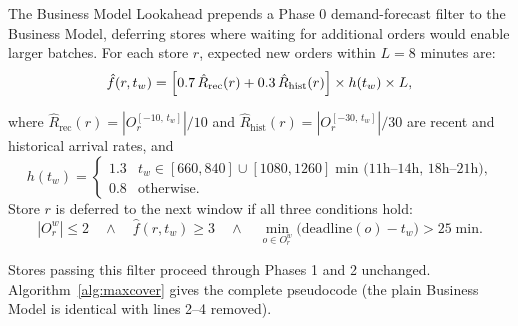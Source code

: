 \documentclass[runningheads]{llncs}
\begin{document}
The Business Model Lookahead prepends a Phase 0 demand-forecast filter to the Business Model, deferring stores where waiting for additional orders would enable larger batches.
For each store $r$, expected new orders within $L=8$ minutes are:
\vspace{-10pt}
\begin{equation}\label{eq:forecast}
    \hat{f}(r, t_w) =
    \Bigl[0.7\,\hat{R}_{\text{rec}}(r) + 0.3\,\hat{R}_{\text{hist}}(r)\Bigr]
    \times h(t_w) \times L,
\end{equation}

where $\hat{R}_{\text{rec}}(r) = |O_{r}^{[-10,\,t_w]}|/10$ and $\hat{R}_{\text{hist}}(r) = |O_{r}^{[-30,\,t_w]}|/30$ are recent and historical arrival rates, and
\vspace{-6pt}
{\small
\begin{equation}\label{eq:hour_mult}
    h(t_w) =
    \begin{cases}
        1.3 & t_w \in [660, 840] \cup [1080, 1260]\;\text{min (11h--14h, 18h--21h),} \\
        0.8 & \text{otherwise.}
    \end{cases}
\end{equation}
}
\vspace{-6pt}
Store $r$ is deferred to the next window if all three conditions hold:
\vspace{-5pt}
\begin{equation}\label{eq:wait_condition}
    |O^w_r| \leq 2
    \quad\wedge\quad
    \hat{f}(r, t_w) \geq 3
    \quad\wedge\quad
    \min_{o \in O^w_r}\!\bigl(\text{deadline}(o) - t_w\bigr) > 25\;\text{min.}
\end{equation}

Stores passing this filter proceed through Phases 1 and 2 unchanged.
Algorithm~\ref{alg:maxcover} gives the complete pseudocode (the plain Business Model is identical with lines 2--4 removed).
\end{document}
